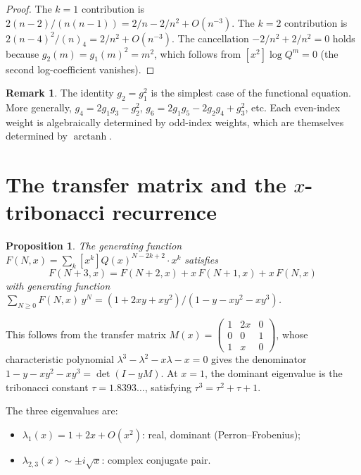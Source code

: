 \documentclass[11pt]{amsart}
\newtheorem{proposition}[theorem]{Proposition}
\theoremstyle{definition}
\newtheorem{remark}[theorem]{Remark}
\DeclareMathOperator{\arctanh}{arctanh}
\begin{document}
\begin{proof}
The $k{=}1$ contribution is $2(n{-}2)/(n(n{-}1)) = 2/n - 2/n^2 + O(n^{-3})$. The $k{=}2$ contribution is $2(n{-}4)^2/(n)_4 = 2/n^2 + O(n^{-3})$. The cancellation $-2/n^2 + 2/n^2 = 0$ holds because $g_2(m) = g_1(m)^2 = m^2$, which follows from $[x^2]\log Q^m = 0$ (the second log-coefficient vanishes).
\end{proof}

\begin{remark}
The identity $g_2 = g_1^2$ is the simplest case of the functional equation. More generally, $g_4 = 2g_1 g_3 - g_2^2$, $g_6 = 2g_1 g_5 - 2g_2 g_4 + g_3^2$, etc. Each even-index weight is algebraically determined by odd-index weights, which are themselves determined by $\arctanh$.
\end{remark}

\section{The transfer matrix and the $x$-tribonacci recurrence}

\begin{proposition}\label{prop:transfer}
The generating function $F(N,x) = \sum_k [x^k]Q(x)^{N-2k+2}\cdot x^k$ satisfies
\[
F(N{+}3,x) = F(N{+}2,x) + x\,F(N{+}1,x) + x\,F(N,x)
\]
with generating function $\sum_{N \geq 0} F(N,x)\,y^N = (1+2xy+xy^2)/(1-y-xy^2-xy^3)$.
\end{proposition}

This follows from the transfer matrix $M(x) = \left(\begin{smallmatrix}1&2x&0\\0&0&1\\1&x&0\end{smallmatrix}\right)$, whose characteristic polynomial $\lambda^3 - \lambda^2 - x\lambda - x = 0$ gives the denominator $1 - y - xy^2 - xy^3 = \det(I - yM)$. At $x = 1$, the dominant eigenvalue is the tribonacci constant $\tau = 1.8393\ldots$, satisfying $\tau^3 = \tau^2 + \tau + 1$.

The three eigenvalues are:
\begin{itemize}
\item $\lambda_1(x) = 1 + 2x + O(x^2)$: real, dominant (Perron--Frobenius);
\item $\lambda_{2,3}(x) \sim \pm i\sqrt{x}$: complex conjugate pair.
\end{itemize}
\end{document}
